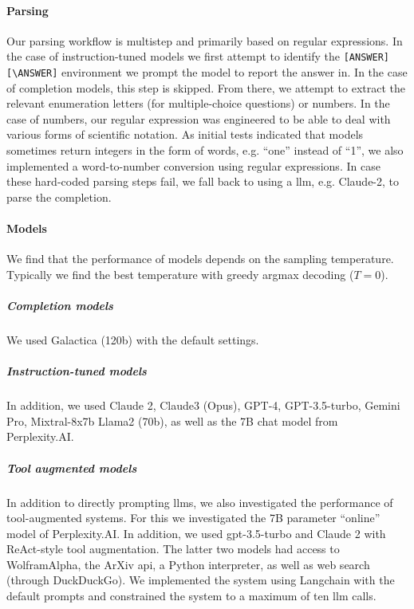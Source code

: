 \documentclass[11pt, oneside]{article}
\begin{document}
\begin{refsection}
\paragraph{Parsing}
Our parsing workflow is multistep and primarily based on regular expressions.
In the case of instruction-tuned models we first attempt to identify the \texttt{[ANSWER][\textbackslash ANSWER]} environment we prompt the model to report the answer in.
In the case of completion models, this step is skipped. From there, we attempt to extract the relevant enumeration letters (for multiple-choice questions) or numbers.
In the case of numbers, our regular expression was engineered to be able to deal with various forms of scientific notation.
As initial tests indicated that models sometimes return integers in the form of words, e.g. \enquote{one} instead of \enquote{1}, we also implemented a word-to-number conversion using regular expressions.
In case these hard-coded parsing steps fail, we fall back to using a \gls{llm}, e.g. Claude-2, to parse the completion.



\paragraph{Models}
We find that the performance of models depends on the sampling temperature. Typically we find the best temperature with greedy argmax decoding ($T=0$).
\subparagraph{Completion models}
We used Galactica (120b)\autocite{taylor2022galactica} with the default settings.


\subparagraph{Instruction-tuned models} In addition, we used Claude 2, Claude3 (Opus),\autocite{anthropicClaudeModelFamily2024} GPT-4,\autocite{openai2024gpt4} GPT-3.5-turbo,\autocite{brown2020language} Gemini Pro,\autocite{gemini} Mixtral-8x7b\autocite{jiang2024mixtral} Llama2 (70b),\autocite{touvron2023llama} as well as the 7B chat model from Perplexity.AI.

\subparagraph{Tool augmented models}
In addition to directly prompting \glspl{llm}, we also investigated the performance of tool-augmented systems.
For this we investigated the 7B parameter \enquote{online} model of Perplexity.AI. 
In addition, we used gpt-3.5-turbo and Claude 2 with ReAct-style tool augmentation.\autocite{yao2023react}
The latter two models had access to WolframAlpha, the ArXiv \gls{api}, a Python interpreter, as well as web search (through DuckDuckGo).
We implemented the system using Langchain with the default prompts and constrained the system to a maximum of ten \gls{llm} calls.



\end{refsection}
\end{document}
